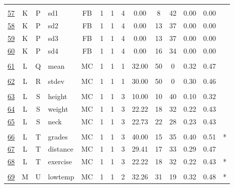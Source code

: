 \documentclass[12pt,english,nohyper]{tufte-handout}\usepackage[]{graphicx}\usepackage[]{color}
\begin{document}
\begin{longtable}{cccl|cccc|ccccc|l}
   &  &  &  &  &  &  &  &  &  &  &  &  &  \\ 
  \hyperlink{T03.K.P.04.1.1.FB.sd1.2}{57} & K & P & sd1 & FB &   1 &   1 &   4 & 0.00 &   8 &  42 & 0.00 & 0.00 &  \\ 
  \hyperlink{T03.K.P.04.1.1.FB.sd2.2}{58} & K & P & sd2 & FB &   1 &   1 &   4 & 0.00 &  13 &  37 & 0.00 & 0.00 &  \\ 
  \hyperlink{T03.K.P.04.1.1.FB.sd3.2}{59} & K & P & sd3 & FB &   1 &   1 &   4 & 0.00 &  13 &  37 & 0.00 & 0.00 &  \\ 
  \hyperlink{T03.K.P.04.1.1.FB.sd4.2}{60} & K & P & sd4 & FB &   1 &   1 &   4 & 0.00 &  16 &  34 & 0.00 & 0.00 &  \\ 
   &  &  &  &  &  &  &  &  &  &  &  &  &  \\ 
  \hyperlink{T03.L.Q.01.1.1.MC.mean.2}{61} & L & Q & mean & MC &   1 &   1 &   1 & 32.00 &  50 &   0 & 0.32 & 0.47 &  \\ 
   &  &  &  &  &  &  &  &  &  &  &  &  &  \\ 
  \hyperlink{T03.L.R.01.1.1.MC.stdev.2}{62} & L & R & stdev & MC &   1 &   1 &   1 & 30.00 &  50 &   0 & 0.30 & 0.46 &  \\ 
   &  &  &  &  &  &  &  &  &  &  &  &  &  \\ 
  \hyperlink{T03.L.S.03.1.1.MC.height.2}{63} & L & S & height & MC &   1 &   1 &   3 & 10.00 &  10 &  40 & 0.10 & 0.32 &  \\ 
  \hyperlink{T03.L.S.03.1.1.MC.weight.2}{64} & L & S & weight & MC &   1 &   1 &   3 & 22.22 &  18 &  32 & 0.22 & 0.43 &  \\ 
  \hyperlink{T03.L.S.03.1.1.MC.neck.2}{65} & L & S & neck & MC &   1 &   1 &   3 & 22.73 &  22 &  28 & 0.23 & 0.43 &  \\ 
   &  &  &  &  &  &  &  &  &  &  &  &  &  \\ 
  \hyperlink{T03.L.T.03.1.1.MC.grades.2}{66} & L & T & grades & MC &   1 &   1 &   3 & 40.00 &  15 &  35 & 0.40 & 0.51 & * \\ 
  \hyperlink{T03.L.T.03.1.1.MC.distance.2}{67} & L & T & distance & MC &   1 &   1 &   3 & 29.41 &  17 &  33 & 0.29 & 0.47 &  \\ 
  \hyperlink{T03.L.T.03.1.1.MC.exercise.2}{68} & L & T & exercise & MC &   1 &   1 &   3 & 22.22 &  18 &  32 & 0.22 & 0.43 & * \\ 
   &  &  &  &  &  &  &  &  &  &  &  &  &  \\ 
  \hyperlink{T03.M.U.02.1.1.MC.lowtemp.2}{69} & M & U & lowtemp & MC &   1 &   1 &   2 & 32.26 &  31 &  19 & 0.32 & 0.48 & * \\ 

\end{longtable}
\end{document}
